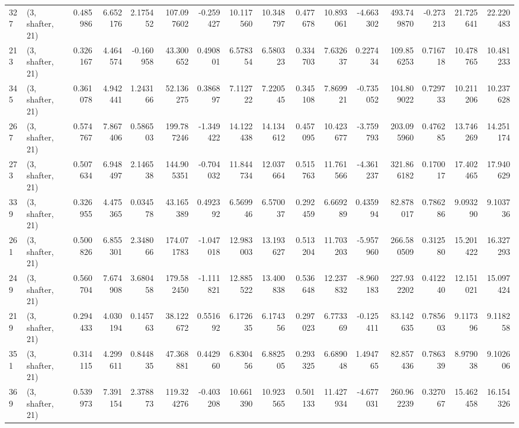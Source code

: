 \begin{tabular}{llrrrrrrrrrrrrrr}
327 &  (3, shafter, 21) &   0.485986 &   6.652176 &   2.175452 &   107.097602 &  -0.259427 &  10.117560 &  10.348797 &  0.477678 &  10.893061 &  -4.663302 &    493.749870 &  -0.273213 &   21.725641 &   22.220483 \\
213 &  (3, shafter, 21) &   0.326167 &   4.464574 &  -0.160958 &    43.300652 &   0.490801 &   6.578354 &   6.580323 &  0.334703 &   7.632637 &   0.227434 &    109.856253 &   0.716718 &   10.478765 &   10.481233 \\
345 &  (3, shafter, 21) &   0.361078 &   4.942441 &   1.243166 &    52.136275 &   0.386897 &   7.112722 &   7.220545 &  0.345108 &   7.869921 &  -0.735052 &    104.809022 &   0.729733 &   10.211206 &   10.237628 \\
267 &  (3, shafter, 21) &   0.574767 &   7.867406 &   0.586503 &   199.787246 &  -1.349422 &  14.122438 &  14.134612 &  0.457095 &  10.423677 &  -3.759793 &    203.095960 &   0.476285 &   13.746269 &   14.251174 \\
273 &  (3, shafter, 21) &   0.507634 &   6.948497 &   2.146538 &   144.905351 &  -0.704032 &  11.844734 &  12.037664 &  0.515763 &  11.761566 &  -4.361237 &    321.866182 &   0.170017 &   17.402465 &   17.940629 \\
339 &  (3, shafter, 21) &   0.326955 &   4.475365 &   0.034578 &    43.165389 &   0.492392 &   6.569946 &   6.570037 &  0.292459 &   6.669289 &   0.435994 &     82.878017 &   0.786286 &    9.093290 &    9.103736 \\
261 &  (3, shafter, 21) &   0.500826 &   6.855301 &   2.348066 &   174.071783 &  -1.047018 &  12.983003 &  13.193627 &  0.513204 &  11.703203 &  -5.957960 &    266.580509 &   0.312580 &   15.201422 &   16.327293 \\
249 &  (3, shafter, 21) &   0.560704 &   7.674908 &   3.680458 &   179.582450 &  -1.111821 &  12.885522 &  13.400838 &  0.536648 &  12.237832 &  -8.960183 &    227.932202 &   0.412240 &   12.151021 &   15.097424 \\
219 &  (3, shafter, 21) &   0.294433 &   4.030194 &   0.145763 &    38.122672 &   0.551692 &   6.172635 &   6.174356 &  0.297023 &   6.773369 &  -0.125411 &     83.142635 &   0.785603 &    9.117396 &    9.118258 \\
351 &  (3, shafter, 21) &   0.314115 &   4.299611 &   0.844835 &    47.368881 &   0.442960 &   6.830456 &   6.882505 &  0.293325 &   6.689048 &   1.494765 &     82.857436 &   0.786339 &    8.979038 &    9.102606 \\
369 &  (3, shafter, 21) &   0.539973 &   7.391154 &   2.378873 &   119.324276 &  -0.403208 &  10.661390 &  10.923565 &  0.501133 &  11.427934 &  -4.677031 &    260.962239 &   0.327067 &   15.462458 &   16.154326 \\

\end{tabular}
